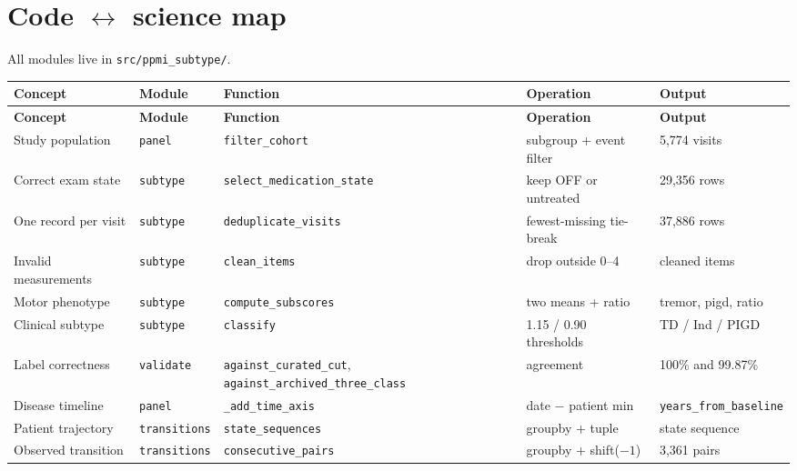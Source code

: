 \documentclass[11pt,a4paper]{article}
\newcommand{\code}[1]{\texttt{\small #1}}
\begin{document}
\section{Code $\leftrightarrow$ science map}

All modules live in \code{src/ppmi\_subtype/}.

\begin{longtable}{@{}p{2.3cm} p{2.2cm} p{3.7cm} p{2.9cm} p{2.4cm}@{}}
\toprule
\textbf{Concept} & \textbf{Module} & \textbf{Function} & \textbf{Operation} & \textbf{Output} \\
\midrule
\endfirsthead
\toprule
\textbf{Concept} & \textbf{Module} & \textbf{Function} & \textbf{Operation} & \textbf{Output} \\
\midrule
\endhead
Study population & \code{panel} & \code{filter\_cohort} & subgroup + event filter & 5{,}774 visits \\
Correct exam state & \code{subtype} & \code{select\_}\newline\code{medication\_state} & keep OFF or untreated & 29{,}356 rows \\
One record per visit & \code{subtype} & \code{deduplicate\_visits} & fewest-missing tie-break & 37{,}886 rows \\
Invalid measurements & \code{subtype} & \code{clean\_items} & drop outside 0--4 & cleaned items \\
Motor phenotype & \code{subtype} & \code{compute\_subscores} & two means + ratio & tremor, pigd, ratio \\
Clinical subtype & \code{subtype} & \code{classify} & 1.15 / 0.90 thresholds & TD / Ind / PIGD \\
Label correctness & \code{validate} & \code{against\_curated\_cut}, \code{against\_archived\_}\newline\code{three\_class} & agreement & 100\% and 99.87\% \\
Disease timeline & \code{panel} & \code{\_add\_time\_axis} & date $-$ patient min & \code{years\_from\_}\newline\code{baseline} \\
Patient trajectory & \code{transitions} & \code{state\_sequences} & groupby + tuple & state sequence \\
Observed transition & \code{transitions} & \code{consecutive\_pairs} & groupby + shift($-1$) & 3{,}361 pairs \\

\end{longtable}
\end{document}
